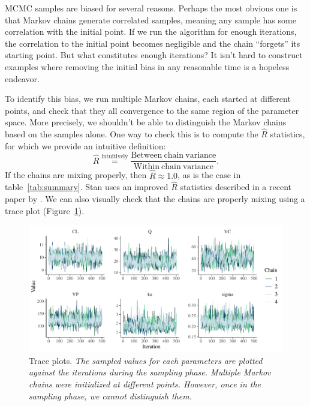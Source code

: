 MCMC samples are biased for several reasons.
Perhaps the most obvious one is that Markov chains generate correlated samples, meaning any sample has some correlation with the initial point.
If we run the algorithm for enough iterations, the correlation to the initial point becomes negligible and the chain ``forgets'' its starting point.
But what constitutes enough iterations?
It isn't hard to construct examples where removing the initial bias in any reasonable time is a hopeless endeavor. 

To identify this bias, we run multiple Markov chains, each started at different points, and check that they all convergence to the same region of the parameter space.
More precisely, we shouldn't be able to distinguish the Markov chains based on the samples alone.
One way to check this is to compute the $\hat R$ statistics, for which we provide an intuitive definition:
\begin{equation*}
  \hat R \overset{\mathrm{intuitively}}{=} \frac{\mathrm{Between \ chain \ variance}}{\mathrm{Within \ chain \ variance}}.
\end{equation*}
%
If the chains are mixing properly, then $\hat R \approx 1.0$, as is the case in table~\ref{tab:summary}.
Stan uses an improved $\hat R$ statistics described in a recent paper by \citet{Vehtari:2020}.
We can also visually check that the chains are properly mixing using a trace plot (Figure~\ref{fig:trace}).

\begin{figure}
  \begin{center}
  \includegraphics[width = 6in]{../figures/twocpt_traceplots_4x8.pdf}
  \caption{Trace plots. \textit{The sampled values for each parameters are plotted against the iterations during the sampling phase. Multiple Markov chains were initialized at different points. However, once in the sampling phase, we cannot distinguish them.}}
  \label{fig:trace}
  \end{center}
\end{figure}

